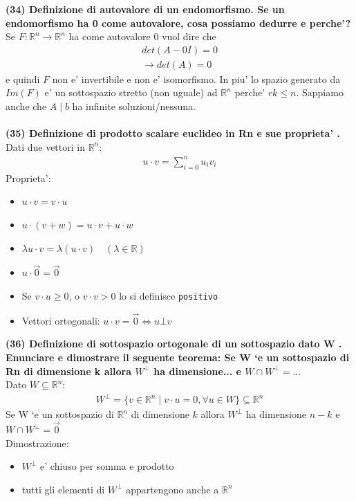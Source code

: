 \documentclass[10pt]{extarticle}
\begin{document}
\textbf{(34) Definizione di autovalore di un endomorfismo. Se un endomorfismo ha 0 come autovalore, cosa possiamo dedurre e perche'?} \\
Se $F: \mathbb{R}^n \to \mathbb{R}^n$ ha come autovalore 0 vuol dire che 
\begin{align*}
    det(A-0I)=0 \\
    \to det(A)=0
\end{align*}
e quindi $F$ non e' invertibile e non e' isomorfismo. In piu' lo spazio generato da $Im(F)$ e' un sottospazio stretto (non uguale) ad $\mathbb{R}^n$ perche' $rk \leq n$. Sappiamo anche che $A\mid b$ ha infinite soluzioni/nessuna. \\
\vspace{1em}\\
\textbf{(35) Definizione di prodotto scalare euclideo in Rn e sue proprieta' .}
Dati due vettori in $\mathbb{R}^n$:
\begin{align*}
    u \cdot v = \sum_{i=0}^n u_i v_i
\end{align*}
Proprieta':
\begin{itemize}
    \item $u\cdot v = v \cdot u$
    \item $u \cdot (v+w)=u\cdot v+u\cdot w$
    \item $\lambda u \cdot v= \lambda(u\cdot v) \quad (\lambda \in \mathbb{R})$ 
    \item $u \cdot \vec{0}=\vec{0}$
    \item Se $v\cdot u \geq 0 $, o $v \cdot v > 0$ lo si definisce \texttt{positivo}
    \item Vettori ortogonali: $u \cdot v=\vec{0} \iff u \bot v$
\end{itemize}
\vspace{1em}
\textbf{(36) Definizione di sottospazio ortogonale di un sottospazio dato W . Enunciare e dimostrare il seguente teorema: Se W `e un sottospazio di Rn di dimensione k allora $W ^\bot$ ha dimensione... e $W \cap W^\bot =...$} \\
Dato $W \subseteq \mathbb{R}^n$:
\begin{align*}
    W^\bot=\{v \in \mathbb{R}^n \mid v \cdot u=0, \forall u \in W\} \subseteq \mathbb{R}^n
\end{align*}
Se W ‘e un sottospazio di $\mathbb{R}^n$ di dimensione $k$ allora $W^\bot$ ha dimensione $n-k$ e $W \cap W^\bot = \vec{0}$ \\
Dimostrazione: 
\begin{itemize}
    \item $W^\bot$ e' chiuso per somma e prodotto
    \item tutti gli elementi di $W^\bot$ appartengono anche a $\mathbb{R}^n$
\end{itemize}
\end{document}
